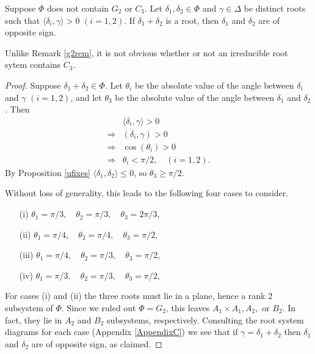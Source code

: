 \begin{proposition} \label{uabelian}
Suppose $\Phi$ does not contain $G_2$ or $C_3$. Let $\delta_1, \delta_2 \in \Phi$ and $\gamma \in \Delta$ be distinct roots such that $\langle \delta_i, \gamma \rangle > 0$ $(i = 1, 2)$. If $\delta_1 + \delta_2$ is a root, then $\delta_1$ and $\delta_2$ are of opposite sign.
\end{proposition}
\begin{remark}\label{c3rem}
Unlike Remark \ref{g2rem}, it is not obvious whether or not an irreducible root sytem contains $C_3$.
\end{remark}
\begin{proof}
Suppose $\delta_1 + \delta_2 \in \Phi$. Let $\theta_i$ be the absolute value of the angle between $\delta_i$ and $\gamma$ $(i = 1,2)$, and let $\theta_3$ be the absolute value of the angle between $\delta_1$ and $\delta_2$. Then
\begin{align*}
&\langle \delta_i, \gamma\rangle > 0 \\
\Rightarrow &(\delta_i, \gamma) > 0 \\
\Rightarrow &\cos(\theta_i) > 0 \\
\Rightarrow &\theta_i < \pi/2,\quad (i = 1,2).
\end{align*}
By Proposition \ref{ufixes} $\langle \delta_1, \delta_2 \rangle \leq 0$, so $\theta_3 \geq \pi/2$.

Without loss of generality, this leads to the following four cases to consider.
\begin{itemize}
\item[(i)]$\theta_1 = \pi/3,\quad\theta_2 = \pi/3,\quad\theta_3 = 2\pi/3$,
\item[(ii)]$\theta_1 = \pi/4,\quad\theta_2 = \pi/4,\quad\theta_3 = \pi/2$,
\item[(iii)]$\theta_1 = \pi/4,\quad\theta_2 = \pi/3,\quad\theta_3 = \pi/2$,
\item[(iv)]$\theta_1 = \pi/3,\quad\theta_2 = \pi/3,\quad\theta_3 = \pi/2$,
\end{itemize}

For cases (i) and (ii) the three roots must lie in a plane, hence a rank 2 subsystem of $\Phi$. Since we ruled out $\Phi=G_2$, this leaves $A_1 \times A_1, A_2,$ or $B_2$. In fact, they lie in $A_2$ and $B_2$ subsystems, respectively. Consulting the root system diagrams for each case (Appendix \ref{AppendixC}) we see that if $\gamma = \delta_1 + \delta_2$ then $\delta_1$ and $\delta_2$ are of opposite sign, as claimed.


\end{proof}
